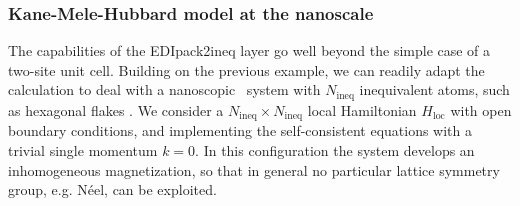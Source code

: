 \documentclass[edipack_sp.tex]{subfiles}
\begin{document}
\subsubsection{Kane-Mele-Hubbard model at the nanoscale}
The capabilities of the EDIpack2ineq layer go well beyond the
simple case of a two-site unit cell. Building on the previous example, we can readily adapt the calculation to deal with a nanoscopic~\cite{Amaricci2014PRA} system with $N_\mathrm{ineq}$ inequivalent atoms, such as hexagonal flakes
\cite{Valli2016PRB,Valli2018NL}.
We consider a 
$N_\mathrm{ineq}\times N_\mathrm{ineq}$ local Hamiltonian 
$H_\mathrm{loc}$ with open boundary conditions, and implementing
the self-consistent equations with a trivial single momentum 
$k=0$. In this configuration the system develops an inhomogeneous magnetization, so that in general no particular lattice symmetry group, e.g. N\'eel, can be exploited. 
\end{document}
